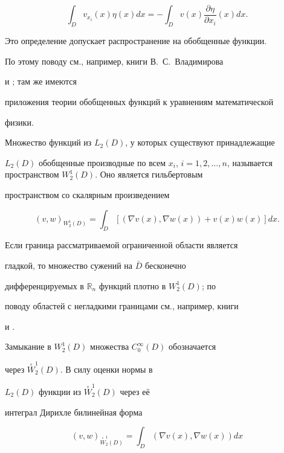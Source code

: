 $$

\int _D v_{x_i}(x) \eta (x) dx = - \int _D v(x) \frac{\partial\eta}{\partial

x_i}(x) dx.

$$

Это определение допускает распространение на обобщенные функции.

По этому поводу см., например, книги В.~С.~Владимирова

\cite{gushin:VladOF} и \cite{gushin:Vlad}; там же имеются

приложения теории обобщенных функций к уравнениям математической

физики.



Множество функций из $L_2(D)$, у которых существуют принадлежащие

$L_2(D)$ обобщенные производные по всем  $x_i$, $i = 1, 2, \ldots,

n$, называется пространством $W_2^1(D)$. Оно является гильбертовым

пространством со скалярным произведением

\begin{equation}

\label{gushin:eq2.2} (v, w)_{W_2^1(D)} = \int _D \left[(

\nabla v(x), \nabla w(x)) + v(x) w(x)\right] dx.

\end{equation}



Если граница рассматриваемой ограниченной области является

гладкой, то множество сужений на ${\bar{D}}$ бесконечно

дифференцируемых в ${\mathbb{R}}_n$ функций плотно в $W_2^1(D)$; по

поводу областей с негладкими границами см., например, книги

\cite{gushin:GTr,gushin:LUr,gushin:BIN} и \cite{gushin:Maz}.

Замыкание в $W_2^1(D)$ множества  $C_0^{\infty}(D)$ обозначается

через ${\stackrel{\circ}{W}}_2^1(D)$. В силу оценки нормы в

$L_2(D)$ функции из ${\stackrel{\circ}{W}_2^1(D)}$ через её

интеграл Дирихле билинейная форма

\begin{equation}

\label{gushin:eq2.3} (v, w)_{{\stackrel{\circ}{W}_2^1(D)}} =

\int _D ( \nabla v(x), \nabla w(x)) dx

\end{equation}

